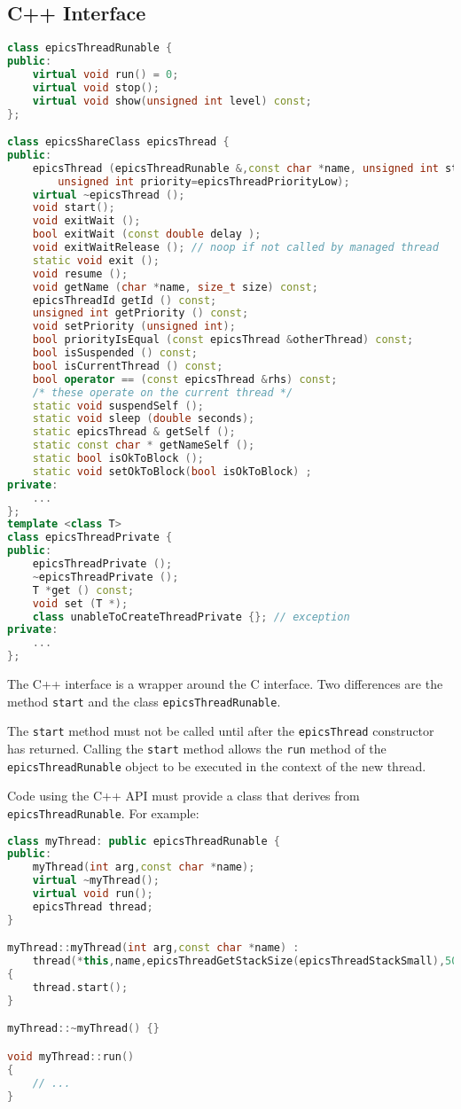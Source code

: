 \subsection{C++ Interface}

\begin{lstlisting}[language=C++]
class epicsThreadRunable {
public:
    virtual void run() = 0;
    virtual void stop();
    virtual void show(unsigned int level) const;
};

class epicsShareClass epicsThread {
public:
    epicsThread (epicsThreadRunable &,const char *name, unsigned int stackSize,
        unsigned int priority=epicsThreadPriorityLow);
    virtual ~epicsThread ();
    void start();
    void exitWait ();
    bool exitWait (const double delay );
    void exitWaitRelease (); // noop if not called by managed thread
    static void exit ();
    void resume ();
    void getName (char *name, size_t size) const;
    epicsThreadId getId () const;
    unsigned int getPriority () const;
    void setPriority (unsigned int);
    bool priorityIsEqual (const epicsThread &otherThread) const;
    bool isSuspended () const;
    bool isCurrentThread () const;
    bool operator == (const epicsThread &rhs) const;
    /* these operate on the current thread */
    static void suspendSelf ();
    static void sleep (double seconds);
    static epicsThread & getSelf ();
    static const char * getNameSelf ();
    static bool isOkToBlock ();
    static void setOkToBlock(bool isOkToBlock) ;
private:
    ...
};
template <class T>
class epicsThreadPrivate {
public:
    epicsThreadPrivate ();
    ~epicsThreadPrivate ();
    T *get () const;
    void set (T *);
    class unableToCreateThreadPrivate {}; // exception
private:
    ...
};
\end{lstlisting}

The C++ interface is a wrapper around the C interface.
Two differences are the method \verb|start| and the class 
\verb|epicsThreadRunable|.

The \verb|start| method must not be called until after the \verb|epicsThread| constructor has returned.
Calling the \verb|start| method allows the \verb|run| method of the \verb|epicsThreadRunable| object to be executed in the context of the new thread.

Code using the C++ API must provide a class that derives from \verb|epicsThreadRunable|.
For example:

\begin{lstlisting}[language=C++]
class myThread: public epicsThreadRunable {
public:
    myThread(int arg,const char *name);
    virtual ~myThread();
    virtual void run();
    epicsThread thread;
}

myThread::myThread(int arg,const char *name) :
    thread(*this,name,epicsThreadGetStackSize(epicsThreadStackSmall),50)
{
    thread.start();
}

myThread::~myThread() {}

void myThread::run()
{
    // ...
}
\end{lstlisting}

